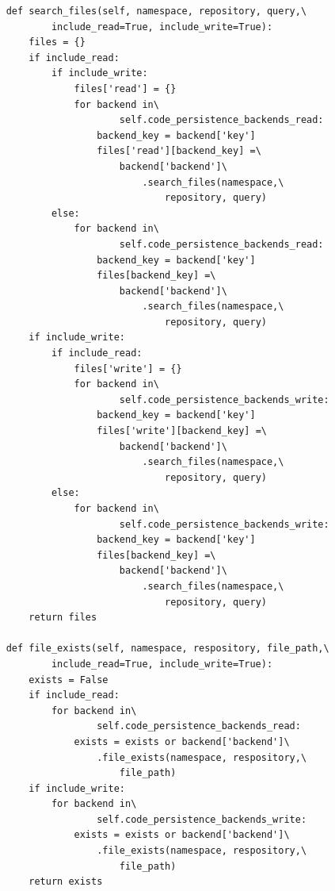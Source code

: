 \begin{lstlisting}
    def search_files(self, namespace, repository, query,\
            include_read=True, include_write=True):
        files = {}
        if include_read:
            if include_write:
                files['read'] = {}
                for backend in\
                        self.code_persistence_backends_read:
                    backend_key = backend['key']
                    files['read'][backend_key] =\
                        backend['backend']\
                            .search_files(namespace,\
                                repository, query)
            else:
                for backend in\
                        self.code_persistence_backends_read:
                    backend_key = backend['key']
                    files[backend_key] =\
                        backend['backend']\
                            .search_files(namespace,\
                                repository, query)
        if include_write:
            if include_read:
                files['write'] = {}
                for backend in\
                        self.code_persistence_backends_write:
                    backend_key = backend['key']
                    files['write'][backend_key] =\
                        backend['backend']\
                            .search_files(namespace,\
                                repository, query)
            else:
                for backend in\
                        self.code_persistence_backends_write:
                    backend_key = backend['key']
                    files[backend_key] =\
                        backend['backend']\
                            .search_files(namespace,\
                                repository, query)
        return files

    def file_exists(self, namespace, respository, file_path,\
            include_read=True, include_write=True):
        exists = False
        if include_read:
            for backend in\
                    self.code_persistence_backends_read:
                exists = exists or backend['backend']\
                    .file_exists(namespace, respository,\
                        file_path)
        if include_write:
            for backend in\
                    self.code_persistence_backends_write:
                exists = exists or backend['backend']\
                    .file_exists(namespace, respository,\
                        file_path)
        return exists


\end{lstlisting}
